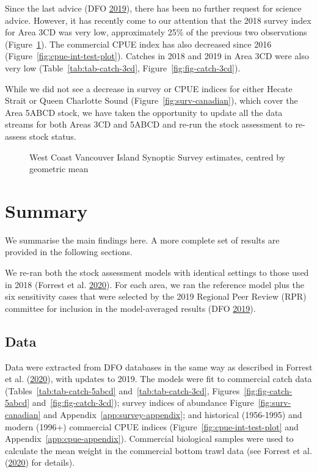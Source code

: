 \documentclass[11pt]{book}
\begin{document}
Since the last advice (DFO \protect\hyperlink{ref-dfo2019}{2019}), there has been no further request for science advice. However, it has recently come to our attention that the 2018 survey index for Area 3CD was very low, approximately 25\% of the previous two observations (Figure~\ref{fig:fig-wcvi-index-3cd}). The commercial CPUE index has also decreased since 2016 (Figure~\ref{fig:cpue-int-test-plot}). Catches in 2018 and 2019 in Area 3CD were also very low (Table~\ref{tab:tab-catch-3cd}, Figure~\ref{fig:fig-catch-3cd}).

While we did not see a decrease in survey or CPUE indices for either Hecate Strait or Queen Charlotte Sound (Figure~\ref{fig:surv-canadian}), which cover the Area 5ABCD stock, we have taken the opportunity to update all the data streams for both Areas 3CD and 5ABCD and re-run the stock assessment to re-assess stock status.
\begin{figure}[htb]

{\centering {} 

}

\caption{West Coast Vancouver Island Synoptic Survey estimates, centred by geometric mean}\label{fig:fig-wcvi-index-3cd}
\end{figure}
\hypertarget{summary}{%
\section{Summary}\label{summary}}

We summarise the main findings here. A more complete set of results are provided in the following sections.

We re-ran both the stock assessment models with identical settings to those used in 2018 (Forrest et al. \protect\hyperlink{ref-forrest2020}{2020}). For each area, we ran the reference model plus the six sensitivity cases that were selected by the 2019 Regional Peer Review (RPR) committee for inclusion in the model-averaged results (DFO \protect\hyperlink{ref-dfo2019}{2019}).

\hypertarget{data}{%
\subsection{Data}\label{data}}

Data were extracted from DFO databases in the same way as described in Forrest et al. (\protect\hyperlink{ref-forrest2020}{2020}), with updates to 2019. The models were fit to commercial catch data (Tables~\ref{tab:tab-catch-5abcd} and~\ref{tab:tab-catch-3cd}, Figures~\ref{fig:fig-catch-5abcd} and~\ref{fig:fig-catch-3cd}); survey indices of abundance Figure~\ref{fig:surv-canadian} and Appendix~\ref{app:survey-appendix}; and historical (1956-1995) and modern (1996+) commercial CPUE indices (Figure~\ref{fig:cpue-int-test-plot} and Appendix~\ref{app:cpue-appendix}). Commercial biological samples were used to calculate the mean weight in the commercial bottom trawl data (see Forrest et al. (\protect\hyperlink{ref-forrest2020}{2020}) for details).
\end{document}
